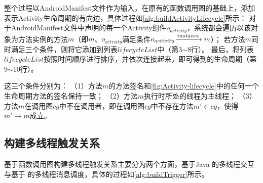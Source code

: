 整个过程以AndroidManifest文件作为输入，在原有的函数调用图的基础上，添加表示Activity生命周期的有向边，具体过程如\autoref{alg:buildActivityLifecycle}所示：
对于AndroidManifest文件中声明的每一个Activity组件$o_{activity}$，系统都会遍历以该对象为方法实例的方法$m$（即$m$、$o_{activity}$满足条件$o_{activity} \joinrel\xrightarrow{instance} m$）；
若方法$m$同时满足三个条件，则将它添加到列表$lifecycleList$中（第3$\sim$8行）。
最后，将列表$lifecycleList$按照时间顺序进行排序，并依次连接起来，即可得到的生命周期（第9$\sim$10行）。

这三个条件分别为：
（1）方法$m$的方法签名和\autoref{fig:Activity-lifecycle}中的任何一个生命周期方法的签名保持一致；
（2）方法$m$执行时所处的线程为主线程；
（3）方法$m$在调用图$cg$中不在调用者，即在调用图$cg$中不存在方法$m' \in cg$，使得$m' \to m $成立。





 \subsection{构建多线程触发关系}
基于函数调用图构建多线程触发关系主要分为两个方面，基于Java 的多线程交互与基于 的多线程消息调度，具体的过程如\autoref{alg:buildTrigger}所示。



